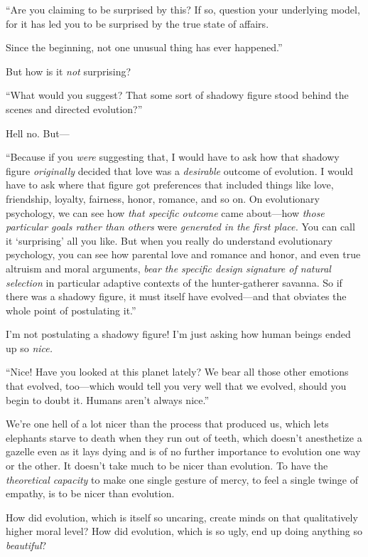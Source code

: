 {
 ``Are you claiming to be surprised by this? If
so, question your underlying model, for it has led you to be surprised
by the true state of affairs.}

{
 Since the beginning,\newline
 not one unusual thing\newline
 has ever happened.''}

{
 But how is it \textit{not} surprising?}

{
 ``What would you suggest? That some sort of
shadowy figure stood behind the scenes and directed
evolution?''}

{
 Hell no. But---}

{
 ``Because if you \textit{were} suggesting that, I
would have to ask how that shadowy figure \textit{originally} decided
that love was a \textit{desirable} outcome of evolution. I would have
to ask where that figure got preferences that included things like
love, friendship, loyalty, fairness, honor, romance, and so on. On
evolutionary psychology, we can see how \textit{that specific outcome}
came about---how \textit{those particular goals rather than others}
were \textit{generated in the first place.} You can call it
`surprising' all you like. But when you
really do understand evolutionary psychology, you can see how parental
love and romance and honor, and even true altruism and moral arguments,
\textit{bear the specific design signature of natural selection} in
particular adaptive contexts of the hunter-gatherer savanna. So if
there was a shadowy figure, it must itself have evolved---and that
obviates the whole point of postulating it.''}

{
 I'm not postulating a shadowy figure!
I'm just asking how human beings ended up so
\textit{nice.}}

{
 ``Nice! Have you looked at this planet lately? We
bear all those other emotions that evolved, too---which would tell you
very well that we evolved, should you begin to doubt it. Humans
aren't always nice.''}

{
 We're one hell of a lot nicer than the process
that produced us, which lets elephants starve to death when they run
out of teeth, which doesn't anesthetize a gazelle even
as it lays dying and is of no further importance to evolution one way
or the other. It doesn't take much to be nicer than
evolution. To have the \textit{theoretical capacity} to make one single
gesture of mercy, to feel a single twinge of empathy, is to be nicer
than evolution.}

{
 How did evolution, which is itself so uncaring, create minds on
that qualitatively higher moral level? How did evolution, which is so
ugly, end up doing anything so \textit{beautiful}?}

